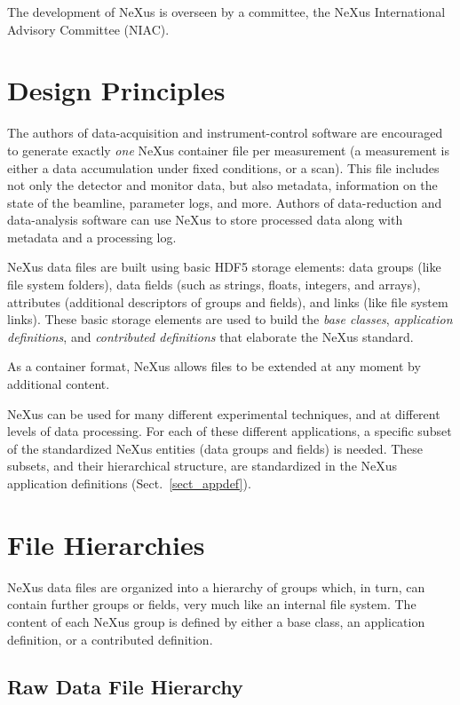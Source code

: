 \documentclass[%
 aip,
rsi,
 amsmath,amssymb,
 reprint,%
]{revtex4-1}
\begin{document}
The development of NeXus is overseen by a committee, the NeXus International Advisory Committee (NIAC).

\section{Design Principles}

The authors of data-acquisition and instrument-control software are encouraged to generate exactly \emph{one} NeXus container file per measurement
(a measurement is either a data accumulation under fixed conditions,
or a scan).
This file includes not only the detector and monitor data,
but also metadata, information on the state of the beamline, parameter logs, and more.
Authors of data-reduction and data-analysis software can use NeXus to
store processed data along with metadata and a processing log.

NeXus data files are built using basic HDF5 storage elements: 
data groups (like file system folders), 
data fields (such as strings, floats, integers, and arrays), 
attributes (additional descriptors of groups and fields), 
and links (like file system links).  These basic storage elements are used to
build the \emph{base classes}, \emph{application definitions},
and \emph{contributed definitions} that elaborate the NeXus standard.

As a container format, NeXus allows files to be extended at any moment by
additional content.

NeXus can be used for many different experimental techniques,
and at different levels of data processing.
For each of these different applications,
a specific subset of the standardized NeXus entities 
(data groups and fields) is needed.
These subsets, and their hierarchical structure, are standardized
in the NeXus application definitions (Sect.~\ref{sect_appdef}).

\section{File Hierarchies}
NeXus data files are organized into a hierarchy of groups which, in turn, can contain further groups or fields, 
very much like an internal file system. The content of each NeXus group is defined by either a base class, 
an application definition, or a contributed definition.


\subsection{Raw Data File Hierarchy}
\end{document}
